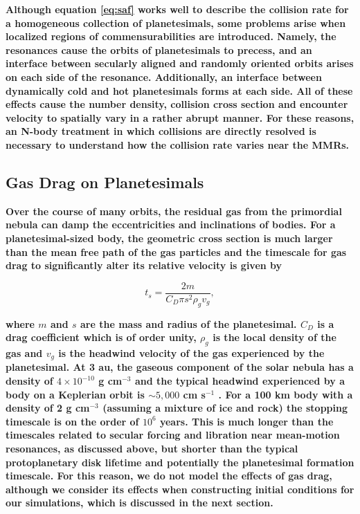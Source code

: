 \documentclass[fleqn,usenatbib]{mnras}
\begin{document}
\textbf{Although equation \ref{eq:saf} works well to describe the collision rate for a homogeneous collection of planetesimals, some problems arise when localized regions of commensurabilities are introduced. Namely, the resonances cause the orbits of planetesimals to precess, and an interface between secularly aligned and randomly oriented orbits arises on each side of the resonance. Additionally, an interface between dynamically cold and hot planetesimals forms at each side. All of these effects cause the number density, collision cross section and encounter velocity to spatially vary in a rather abrupt manner. For these reasons, an N-body treatment in which collisions are directly resolved is necessary to understand how the collision rate varies near the MMRs.}

\subsection{Gas Drag on Planetesimals}\label{sec:pl_drag}

\textbf{Over the course of many orbits, the residual gas from the primordial nebula can damp the eccentricities and inclinations of bodies. For a planetesimal-sized body, the geometric cross section is much larger than the mean free path of the gas particles and the timescale for gas drag to significantly alter its relative velocity is given by \citep{1976PThPh..56.1756A}}

\begin{equation}\label{eq:ts_stokes}
    t_{s} = \frac{2 m}{C_{D} \pi s^{2} \rho_{g} v_{g}},
\end{equation}

\noindent \textbf{where $m$ and $s$ are the mass and radius of the planetesimal. $C_{D}$ is a drag coefficient which is of order unity, $
\rho_{g}$ is the local density of the gas and $v_{g}$ is the headwind velocity of the gas experienced by the planetesimal. At 3 au, the gaseous component of the solar nebula has a density of $4 
\times 10^{-10}$ g cm$^{-3}$ and the typical headwind experienced by a body on a Keplerian orbit is $\sim 5,000$ cm s$^{-1}$ \citep{1981PThPS..70...35H}. For a 100 km body with a 
density of 2 g cm$^{-3}$ \textbf{(assuming a mixture of ice and rock)} the stopping timescale is on the order of $10^{6}$ years. This is much longer than the timescales related to secular forcing and libration near mean-motion resonances, as discussed above, but shorter than the typical protoplanetary disk lifetime and potentially the planetesimal formation timescale. For this reason, we do not model the effects of gas drag, although we consider its effects when constructing initial conditions for our simulations, which is discussed in the next section.}
\end{document}
